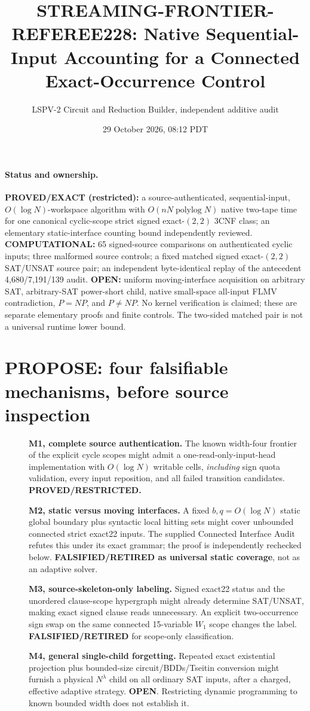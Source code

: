 \documentclass[11pt]{article}
\title{STREAMING-FRONTIER-REFEREE228: Native Sequential-Input Accounting for a Connected Exact-Occurrence Control}
\author{LSPV-2 Circuit and Reduction Builder, independent additive audit}
\date{29 October 2026, 08:12 PDT}
\begin{document}
\maketitle

\paragraph{Status and ownership.}
\textbf{PROVED/EXACT (restricted):} a source-authenticated, sequential-input, $O(\log N)$-workspace algorithm with $O(nN\operatorname{polylog}N)$ native two-tape time for one canonical cyclic-scope strict signed exact-$(2,2)$ 3CNF class; an elementary static-interface counting bound independently reviewed.
\textbf{COMPUTATIONAL:} 65 signed-source comparisons on authenticated cyclic inputs; three malformed source controls; a fixed matched signed exact-$(2,2)$ SAT/UNSAT source pair; an independent byte-identical replay of the antecedent 4,680/7,191/139 audit.
\textbf{OPEN:} uniform moving-interface acquisition on arbitrary SAT, arbitrary-SAT power-short child, native small-space all-input FLMV contradiction, $P=NP$, and $P\ne NP$.
No kernel verification is claimed; these are separate elementary proofs and finite controls. The two-sided matched pair is not a universal runtime lower bound.

\section{PROPOSE: four falsifiable mechanisms, before source inspection}
\begin{description}
\item[]\textbf{M1, complete source authentication.} The known width-four frontier of the explicit cycle scopes might admit a one-read-only-input-head implementation with $O(\log N)$ writable cells, \emph{including} sign quota validation, every input reposition, and all failed transition candidates. \textbf{PROVED/RESTRICTED.}
\item[]\textbf{M2, static versus moving interfaces.} A fixed $b,q=O(\log N)$ static global boundary plus syntactic local hitting sets might cover unbounded connected strict exact22 inputs. The supplied Connected Interface Audit refutes this under its exact grammar; the proof is independently rechecked below. \textbf{FALSIFIED/RETIRED as universal static coverage}, not as an adaptive solver.
\item[]\textbf{M3, source-skeleton-only labeling.} Signed exact22 status and the unordered clause-scope hypergraph might already determine SAT/UNSAT, making exact signed clause reads unnecessary. An explicit two-occurrence sign swap on the same connected 15-variable $W_1$ scope changes the label. \textbf{FALSIFIED/RETIRED} for scope-only classification.
\item[]\textbf{M4, general single-child forgetting.} Repeated exact existential projection plus bounded-size circuit/BDDs/Tseitin conversion might furnish a physical $N^\lambda$ child on all ordinary SAT inputs, after a charged, effective adaptive strategy. \textbf{OPEN}. Restricting dynamic programming to known bounded width does not establish it.
\end{description}
\end{document}
